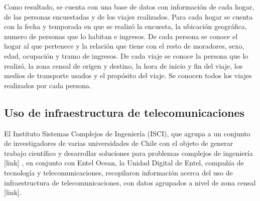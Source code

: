 
Como resultado, se cuenta con una base de datos con información de cada hogar, de las personas encuestadas y de los viajes realizados. Para cada hogar se cuenta con la fecha y temporada en que se realizó la encuesta, la ubicación geográfica, numero de personas que lo habitan e ingresos. De cada persona se conoce el hogar al que pertenece y la relación que tiene con el resto de moradores, sexo, edad, ocupación y tramo de ingresos. De cada viaje se conoce la persona que lo realizó, la zona censal de origen y destino, la hora de inicio y fin del viaje, los medios de transporte usados y el propósito del viaje. Se conocen todos los viajes realizados por cada persona.\\




\subsection{Uso de infraestructura de telecomunicaciones}\label{data:isci}

El Instituto Sistemas Complejos de Ingeniería (ISCI), que agrupa a un conjunto de investigadores de varias universidades de Chile con el objeto de generar trabajo científico y desarrollar soluciones para problemas complejos de ingeniería [link]
, en conjunto con Entel Ocean, la Unidad Digital de Entel, 
compañía de tecnología y telecomunicaciones, recopilaron información acerca del uso de infraestructura de telecomunicaciones, con datos agrupados a nivel de zona censal [link].

